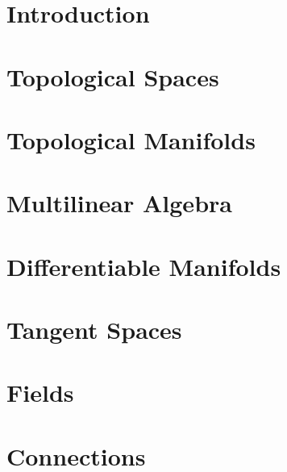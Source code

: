 \documentclass[
11pt, %
a4paper, %
oneside, %
headinclude,footinclude, %
]{scrartcl}
\begin{document}
{\let\thefootnote\relax{}}


\newpage %


\section*{Introduction}



\section{Topological Spaces}



\section{Topological Manifolds}

\section{Multilinear Algebra}

\section{Differentiable Manifolds}

\section{Tangent Spaces}

\section{Fields}

\section{Connections}
\end{document}

